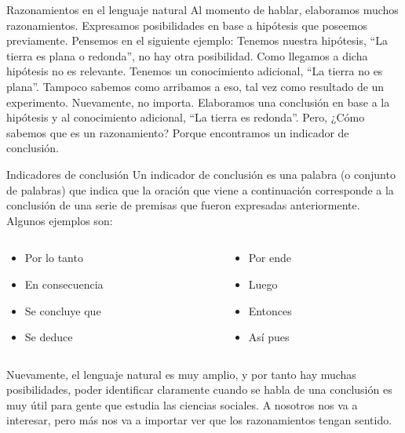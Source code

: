 \begin{frame}{Razonamientos en el lenguaje natural}
  Al momento de hablar, elaboramos muchos razonamientos. Expresamos posibilidades
  en base a hipótesis que poseemos previamente. Pensemos en el siguiente ejemplo:
  \jump
  \jump
  Tenemos nuestra hipótesis, ``La tierra es plana o redonda'', no hay otra
  posibilidad. Como llegamos a dicha hipótesis no es relevante.
  \jump
  Tenemos un conocimiento adicional, ``La tierra no es plana''. Tampoco sabemos
  como arribamos a eso, tal vez como resultado de un experimento. Nuevamente,
  no importa.
  \jump
  Elaboramos una conclusión en base a la hipótesis y al conocimiento adicional,
  ``La tierra es redonda''.
  \jump
  Pero, ¿Cómo sabemos que es un razonamiento? Porque encontramos un indicador
  de conclusión.
\end{frame}


\begin{frame}{Indicadores de conclusión}
  Un indicador de conclusión es una palabra (o conjunto de palabras) que indica
  que la oración que viene a continuación corresponde a la conclusión de una
  serie de premisas que fueron expresadas anteriormente.
  \jump
  Algunos ejemplos son:
  \begin{columns}
    \begin{column}{0.5\textwidth}
      \begin{itemize}
        \item Por lo tanto
        \item En consecuencia
        \item Se concluye que
        \item Se deduce
      \end{itemize}
    \end{column}
    \begin{column}{0.5\textwidth}
      \begin{itemize}
        \item Por ende
        \item Luego
        \item Entonces
        \item Así pues
      \end{itemize}
    \end{column}
  \end{columns}
  \jump
  Nuevamente, el lenguaje natural es muy amplio, y por tanto hay muchas
  posibilidades, poder identificar claramente cuando se habla de una conclusión
  es muy útil para gente que estudia las ciencias sociales. A nosotros nos va
  a interesar, pero más nos va a importar ver que los razonamientos tengan sentido.
\end{frame}

